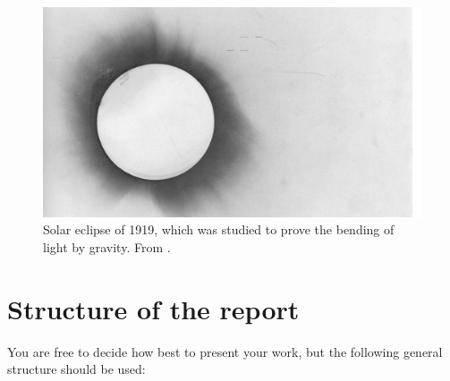 \documentclass[a4paper,fleqn,usenatbib]{mnras}
\begin{document}
\begin{figure}
\includegraphics[width=\columnwidth]{Dyson.jpeg}
\caption{\label{fig:eclipse}Solar eclipse of 1919, which was studied to prove the bending of light by gravity. From \protect\citet{Dyson}.}
\end{figure}

%

\section{Structure of the report}

You are free to decide how best to present your work, but the following general structure should be used:
\end{document}
